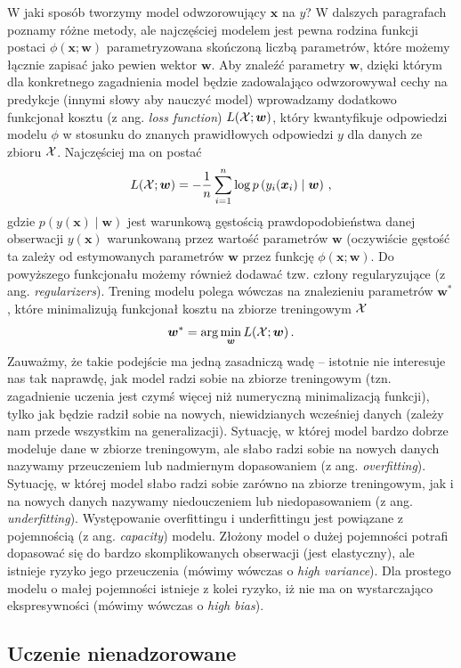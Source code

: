 \documentclass{myclass}
\numberwithin{equation}{subsection}
\begin{document}
W jaki sposób tworzymy model odwzorowujący \(\bm{x}\) na \(y\)? W dalszych paragrafach poznamy różne
metody, ale najczęściej modelem jest pewna rodzina funkcji postaci \(\phi(\bm{x}; \bm{w})\)
parametryzowana skończoną liczbą parametrów, które możemy łącznie zapisać jako pewien wektor
\(\bm{w}\). Aby znaleźć parametry \(\bm{w}\), dzięki którym dla konkretnego zagadnienia model będzie
zadowalająco odwzorowywał cechy na predykcje (innymi słowy aby nauczyć model) wprowadzamy dodatkowo
funkcjonał kosztu (z ang. \textit{loss function}) \(L(\mathcal{X}; \bm{w})\), który kwantyfikuje
odpowiedzi modelu \(\phi\) w stosunku do znanych prawidłowych odpowiedzi \(y\) dla danych ze zbioru
\(\mathcal{X}\). Najczęściej ma on postać
\[
L(\mathcal{X}; \bm{w}) = - \frac{1}{n} \sum_{i=1}^n \log p\left( y_i(\bm{x}_i) \mid \bm{w} \right)\,,
\]
gdzie \(p(y(\bm{x}) \mid \bm{w})\) jest warunkową gęstością prawdopodobieństwa danej obserwacji
\(y(\bm{x})\) warunkowaną przez wartość parametrów \(\bm{w}\) (oczywiście gęstość ta zależy od
estymowanych parametrów \(\bm{w}\) przez funkcję \(\phi(\bm{x};\bm{w})\). Do powyższego funkcjonału
możemy również dodawać tzw. człony regularyzujące (z ang. \textit{regularizers}). Trening modelu
polega wówczas na znalezieniu parametrów \(\bm{w}^*\), które minimalizują funkcjonał kosztu na
zbiorze treningowym \(\mathcal{X}\)
\[
\bm{w}^* = \arg\min_{\bm{w}} L(\mathcal{X};\bm{w})\,.
\]
Zauważmy, że takie podejście ma jedną zasadniczą wadę -- istotnie nie interesuje nas tak naprawdę,
jak model radzi sobie na zbiorze treningowym (tzn. zagadnienie uczenia jest czymś więcej niż
numeryczną minimalizacją funkcji), tylko jak będzie radził sobie na nowych, niewidzianych wcześniej
danych (zależy nam przede wszystkim na generalizacji). Sytuację, w której model bardzo dobrze
modeluje dane w zbiorze treningowym, ale słabo radzi sobie na nowych danych nazywamy przeuczeniem
lub nadmiernym dopasowaniem (z ang. \textit{overfitting}). Sytuację, w której model słabo radzi
sobie zarówno na zbiorze treningowym, jak i na nowych danych nazywamy niedouczeniem lub
niedopasowaniem (z ang. \textit{underfitting}). Występowanie overfittingu i underfittingu jest
powiązane z pojemnością (z ang. \textit{capacity}) modelu. Złożony model o dużej pojemności potrafi
dopasować się do bardzo skomplikowanych obserwacji (jest elastyczny), ale istnieje ryzyko jego
przeuczenia (mówimy wówczas o \textit{high variance}). Dla prostego modelu o małej pojemności
istnieje z kolei ryzyko, iż nie ma on wystarczająco ekspresywności (mówimy wówczas o \textit{high
bias}).


\subsection{Uczenie nienadzorowane}
\end{document}
